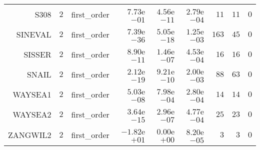 \begin{longtable}{rrrrrrrrr}
S308 & \(     2\) & first\_order & \( 7.73\)e\(-01\) & \( 4.56\)e\(-11\) & \( 2.79\)e\(-04\) & \(    11\) & \(    11\) & \(     0\) \\
SINEVAL & \(     2\) & first\_order & \( 7.39\)e\(-36\) & \( 5.05\)e\(-18\) & \( 1.25\)e\(-03\) & \(   163\) & \(    45\) & \(     0\) \\
SISSER & \(     2\) & first\_order & \( 8.90\)e\(-11\) & \( 1.46\)e\(-07\) & \( 4.53\)e\(-04\) & \(    16\) & \(    16\) & \(     0\) \\
SNAIL & \(     2\) & first\_order & \( 2.12\)e\(-19\) & \( 9.21\)e\(-10\) & \( 2.00\)e\(-03\) & \(    88\) & \(    63\) & \(     0\) \\
WAYSEA1 & \(     2\) & first\_order & \( 5.03\)e\(-08\) & \( 7.98\)e\(-04\) & \( 2.80\)e\(-04\) & \(    14\) & \(    14\) & \(     0\) \\
WAYSEA2 & \(     2\) & first\_order & \( 3.64\)e\(-15\) & \( 2.96\)e\(-07\) & \( 4.77\)e\(-04\) & \(    25\) & \(    23\) & \(     0\) \\
ZANGWIL2 & \(     2\) & first\_order & \(-1.82\)e\(+01\) & \( 0.00\)e\(+00\) & \( 8.20\)e\(-05\) & \(     3\) & \(     3\) & \(     0\) \\\hline
\end{longtable}
